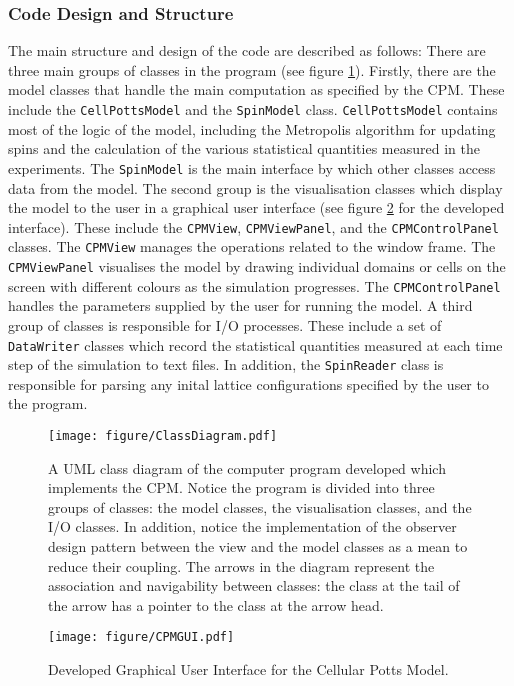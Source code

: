 \documentclass[a4paper,12pt]{article}
\begin{document}
\subsubsection{Code Design and Structure}
The main structure and design of the code are described as follows: There are three main groups of classes in the program (see figure \ref{fig:ClassDiagram}). Firstly, there are the model classes that handle the main computation as specified by the CPM. These include the \texttt{CellPottsModel} and the \texttt{SpinModel} class. \texttt{CellPottsModel} contains most of the logic of the model, including the Metropolis algorithm for updating spins and the calculation of the various statistical quantities measured in the experiments. The \texttt{SpinModel} is the main interface by which other classes access data from the model. The second group is the visualisation classes which display the model to the user in a graphical user interface (see figure \ref{fig:CPMGUI} for the developed interface). These include the \texttt{CPMView}, \texttt{CPMViewPanel}, and the \texttt{CPMControlPanel} classes. The \texttt{CPMView} manages the operations related to the window frame. The \texttt{CPMViewPanel} visualises the model by drawing individual domains or cells on the screen with different colours as the simulation progresses. The \texttt{CPMControlPanel} handles the parameters supplied by the user for running the model.  A third group of classes is responsible for I/O processes. These include a set of \texttt{DataWriter} classes which record the statistical quantities measured at each time step of the simulation to text files. In addition, the \texttt{SpinReader} class is responsible for parsing any inital lattice configurations specified by the user to the program.  
\begin{figure}[h]
\centering
\texttt{[image: figure/ClassDiagram.pdf]}
\caption{A UML class diagram of the computer program developed which implements the CPM. Notice the program is divided into three groups of classes: the model classes, the visualisation classes, and the I/O classes. In addition, notice the implementation of the observer design pattern between the view and the model classes as a mean to reduce their coupling. The arrows in the diagram represent the association and navigability between classes: the class at the tail of the arrow has a pointer to the class at the arrow head.}
\label{fig:ClassDiagram}
\end{figure}
\begin{figure}[h]
\centering
\texttt{[image: figure/CPMGUI.pdf]}
\caption{Developed Graphical User Interface for the Cellular Potts Model.}
\label{fig:CPMGUI}
\end{figure}
\FloatBarrier
\end{document}
